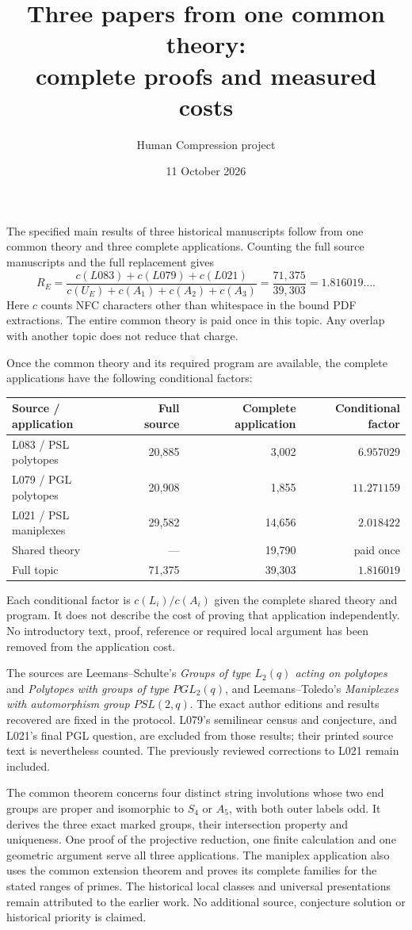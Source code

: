 \documentclass[11pt,a4paper]{article}
\title{Three papers from one common theory:\\complete proofs and measured costs}
\author{Human Compression project}
\date{11 October 2026}
\begin{document}
\maketitle
\noindent The specified main results of three historical manuscripts follow
from one common theory and three complete applications. Counting the full
source manuscripts and the full replacement gives
\[
 R_E=\frac{c(L083)+c(L079)+c(L021)}{c(U_E)+c(A_1)+c(A_2)+c(A_3)}
 =\frac{71{,}375}{39{,}303}=\boxed{1.816019\ldots}.
\]
Here $c$ counts NFC characters other than whitespace in the bound PDF
extractions. The entire common theory is paid once in this topic. Any
overlap with another topic does not reduce that charge.

Once the common theory and its required program are available, the complete
applications have the following conditional factors:
\begin{center}\begin{tabular}{lrrr}\toprule
Source / application & Full source & Complete application & Conditional factor\\\midrule
L083 / PSL polytopes & 20,885 & 3,002 & $6.957029$\\
L079 / PGL polytopes & 20,908 & 1,855 & $11.271159$\\
L021 / PSL maniplexes & 29,582 & 14,656 & $2.018422$\\\midrule
Shared theory & --- & 19,790 & paid once\\
Full topic & 71,375 & 39,303 & $1.816019$\\\bottomrule
\end{tabular}\end{center}
Each conditional factor is $c(L_i)/c(A_i)$ given the complete shared
theory and program. It does not describe the cost of proving that
application independently. No introductory text, proof, reference or
required local argument has been removed from the application cost.

The sources are Leemans--Schulte's \emph{Groups of type $L_2(q)$ acting on
polytopes} and \emph{Polytopes with groups of type $PGL_2(q)$}, and
Leemans--Toledo's \emph{Maniplexes with automorphism group $PSL(2,q)$}.
The exact author editions and results recovered are fixed in the protocol.
L079's semilinear census and conjecture, and L021's final PGL question,
are excluded from those results; their printed source text is nevertheless
counted. The previously reviewed corrections to L021 remain included.

The common theorem concerns four distinct string involutions whose two
end groups are proper and isomorphic to $S_4$ or $A_5$, with both outer
labels odd. It derives the three exact marked groups, their intersection
property and uniqueness. One proof of the projective reduction, one finite
calculation and one geometric argument serve all three applications.
The maniplex application also uses the common extension theorem and proves
its complete families for the stated ranges of primes. The historical local
classes and universal presentations remain attributed to the earlier work.
No additional source, conjecture solution or historical priority is claimed.
\end{document}

